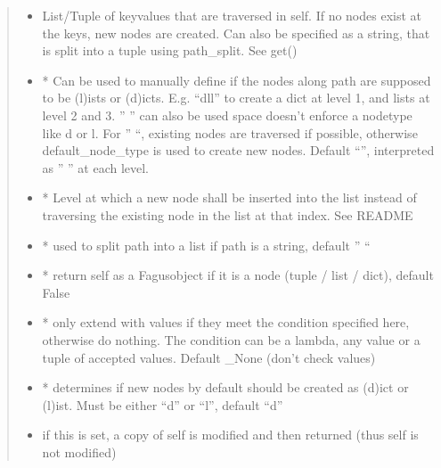 \documentclass[a4paper,10pt,english]{sphinxmanual}
\begin{document}
\begin{fulllineitems}
\begin{fulllineitems}
\begin{quote}
\begin{description}
\begin{itemize}
\item {}
\sphinxAtStartPar
{} \textendash{} List/Tuple of key\sphinxhyphen{}values that are traversed in self. If no nodes exist at the keys, new nodes are
created. Can also be specified as a string, that is split into a tuple using path\_split. See get()

\item {}
\sphinxAtStartPar
{} \textendash{} * Can be used to manually define if the nodes along path are supposed to be (l)ists or
(d)icts. E.g. “dll” to create a dict at level 1, and lists at level 2 and 3. ” ” can also be used \sphinxhyphen{}
space doesn’t enforce a node\sphinxhyphen{}type like d or l. For ” “, existing nodes are traversed if possible,
otherwise default\_node\_type is used to create new nodes. Default “”, interpreted as ” ” at each level.

\item {}
\sphinxAtStartPar
{} \textendash{} * Level at which a new node shall be inserted into the list instead of traversing the
existing node in the list at that index. See README

\item {}
\sphinxAtStartPar
{} \textendash{} * used to split path into a list if path is a string, default ” “

\item {}
\sphinxAtStartPar
{} \textendash{} * return self as a Fagus\sphinxhyphen{}object if it is a node (tuple / list / dict), default False

\item {}
\sphinxAtStartPar
{} \textendash{} * only extend with values if they meet the condition specified here, otherwise do nothing. The
condition can be a lambda, any value or a tuple of accepted values. Default \_None (don’t check values)

\item {}
\sphinxAtStartPar
{} \textendash{} * determines if new nodes by default should be created as (d)ict or (l)ist. Must be
either “d” or “l”, default “d”

\item {}
\sphinxAtStartPar
{} \textendash{} if this is set, a copy of self is modified and then returned (thus self is not modified)


\end{itemize}
\end{description}
\end{quote}
\end{fulllineitems}
\end{fulllineitems}
\end{document}
